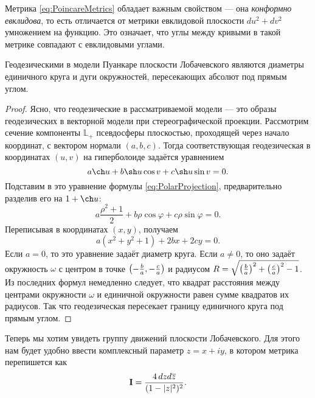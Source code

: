 Метрика \eqref{eq:PoincareMetrics} обладает важным свойством --- она \textit{конформно евклидова}, то есть отличается от метрики евклидовой плоскости $du^2 + dv^2$ умножением на функцию. Это означает, что углы между кривыми в такой метрике совпадают с евклидовыми углами.

\begin{theorem}
	Геодезическими в модели Пуанкаре плоскости Лобачевского являются диаметры единичного круга и дуги окружностей, пересекающих абсолют под прямым углом.
\end{theorem}

\begin{proof}
	Ясно, что геодезические в рассматриваемой модели --- это образы геодезических в векторной модели при стереографической проекции. Рассмотрим сечение компоненты $\mathbb{L}_+$ псевдосферы плоскостью, проходящей через начало координат, с вектором нормали $(a, b, c)$. Тогда соответствующая геодезическая в координатах $(u, v)$ на гиперболоиде задаётся уравнением
	\[
		a\ch u + b\sh u\cos v + c\sh u\sin v= 0.
	\]
	Подставим в это уравнение формулы \eqref{eq:PolarProjection}, предварительно разделив его на $1 + \ch u$:
	\[
		a\frac{\rho^2 + 1}{2} + b\rho\cos\varphi + c\rho\sin\varphi = 0.
	\]
	Переписывая в координатах $(x, y)$, получаем
	\[
		a(x^2 + y^2 + 1) + 2bx + 2cy = 0.
	\]
	Если $a = 0$, то это уравнение задаёт диаметр круга. Если $a \ne 0$, то оно задаёт окружность $\omega$ с центром в точке $\left(-\frac{b}{a}, -\frac{c}{a}\right)$ и радиусом $R = \sqrt{\left(\frac{b}{a}\right)^2 + \left(\frac{c}{a}\right)^2 - 1}$. Из последних формул немедленно следует, что квадрат расстояния между центрами окружности $\omega$ и единичной окружности равен сумме квадратов их радиусов. Так что геодезическая пересекает границу единичного круга под прямым углом.
\end{proof}

Теперь мы хотим увидеть группу движений плоскости Лобачевского. Для этого нам будет удобно ввести комплексный параметр $z = x + iy$, в котором метрика перепишется как
\begin{equation} \label{eq:zMetrics}
	\boldsymbol{\operatorname{I}} = \frac{4\,dzd\overline{z}}{(1 - |z|^2)^2}.
\end{equation}

